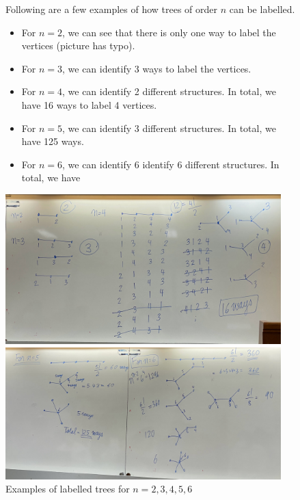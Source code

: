 \begin{figure}[ht]
\begin{nexample}
  Following are a few examples of how trees of order \(n\) can be
  labelled.

  \begin{itemize}
    \item For \(n=2\), we can see that there is only one way to label the vertices
      (picture has typo). 
    \item For \(n=3\), we can identify 3 ways to label the vertices.
    \item For \(n=4\), we can identify 2 different structures. In total, we have 16
      ways to label 4 vertices.
    \item For \(n=5\), we can identify 3 different structures. In total, we have 125
      ways.
    \item For \(n=6\), we can identify 6 identify 6 different structures. In total, we
      have 
  \end{itemize}

  \begin{center}
    \includegraphics[width=0.95\textwidth]{figures/l05/label1}

    \includegraphics[width=0.95\textwidth]{figures/l05/label2}
  \end{center}
  \caption{Examples of labelled trees for \(n=2,3,4,5,6\)}\label{fig:label-examples}
\end{nexample}
\end{figure}
